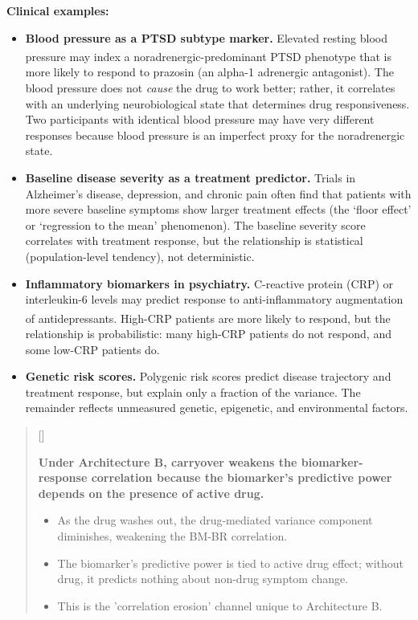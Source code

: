 \documentclass[
  11pt,
]{article}
\newcounter{pgraph}
\newenvironment{bullets}{%
  \stepcounter{pgraph}%
  \begin{quote}\small\sffamily\color[gray]{0.30}%
  {\normalfont\scriptsize\color[gray]{0.58}[\thepgraph]\enspace}}{%
  \end{quote}}
\begin{document}
\textbf{Clinical examples:}

\begin{itemize}
\item
  \textbf{Blood pressure as a PTSD subtype marker.} Elevated resting
  blood pressure may index a noradrenergic-predominant PTSD
  phenotype\textsuperscript{} that is
  more likely to respond to prazosin (an alpha-1 adrenergic antagonist).
  The blood pressure does not \textit{cause} the drug to work better;
  rather, it correlates with an underlying neurobiological state that
  determines drug responsiveness. Two participants with identical blood
  pressure may have very different responses because blood pressure is
  an imperfect proxy for the noradrenergic state.
\item
  \textbf{Baseline disease severity as a treatment predictor.} Trials in
  Alzheimer's disease, depression, and chronic pain often find that
  patients with more severe baseline symptoms show larger treatment
  effects (the `floor effect' or `regression to the mean' phenomenon).
  The baseline severity score correlates with treatment response, but
  the relationship is statistical (population-level tendency), not
  deterministic.
\item
  \textbf{Inflammatory biomarkers in psychiatry.} C-reactive protein
  (CRP) or interleukin-6 levels may predict response to
  anti-inflammatory augmentation of
  antidepressants\textsuperscript{}.
  High-CRP patients are more likely to respond, but the relationship is
  probabilistic: many high-CRP patients do not respond, and some low-CRP
  patients do.
\item
  \textbf{Genetic risk scores.} Polygenic risk scores predict disease
  trajectory and treatment response, but explain only a fraction of the
  variance. The remainder reflects unmeasured genetic, epigenetic, and
  environmental factors.
\end{itemize}

\begin{bullets}

\textbf{Under Architecture B, carryover weakens the
biomarker-response correlation because the biomarker's
predictive power depends on the presence of active drug.}

\begin{itemize}\setlength{\itemsep}{2pt}\setlength{\parskip}{0pt}
\item As the drug washes out, the drug-mediated variance
  component diminishes, weakening the BM-BR correlation.
\item The biomarker's predictive power is tied to active drug
  effect; without drug, it predicts nothing about
  non-drug symptom change.
\item This is the 'correlation erosion' channel unique to
  Architecture B.
\end{itemize}

\end{bullets}
\end{document}
